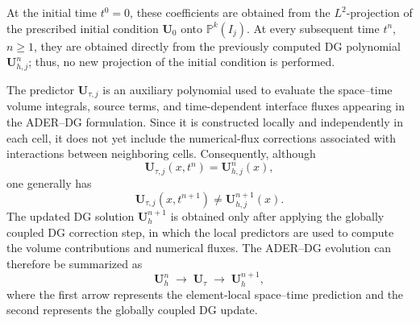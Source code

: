 \documentclass[11pt]{article}
\begin{document}
At the initial time $t^0=0$, these coefficients are obtained from the
$L^2$-projection of the prescribed initial condition $\mathbf{U}_0$ onto
$\mathbb{P}^k(I_j)$. At every subsequent time $t^n$, $n\geq 1$, they are
obtained directly from the previously computed DG polynomial
$\mathbf{U}_{h,j}^n$; thus, no new projection of the initial condition is
performed.

The predictor $\mathbf{U}_{\tau,j}$ is an auxiliary polynomial used to
evaluate the space--time volume integrals, source terms, and time-dependent
interface fluxes appearing in the ADER--DG formulation. Since it is
constructed locally and independently in each cell, it does not yet
include the numerical-flux corrections associated with interactions
between neighboring cells. Consequently, although
\[
    \mathbf{U}_{\tau,j}(x,t^n)
    =
    \mathbf{U}_{h,j}^n(x),
\]
one generally has
\[
    \mathbf{U}_{\tau,j}(x,t^{n+1})
    \neq
    \mathbf{U}_{h,j}^{n+1}(x).
\]
The updated DG solution $\mathbf{U}_h^{n+1}$ is obtained only after applying
the globally coupled DG correction step, in which the local predictors are
used to compute the volume contributions and numerical fluxes. The
ADER--DG evolution can therefore be summarized as
\[
    \mathbf{U}_h^n
    \;\longrightarrow\;
    \mathbf{U}_{\tau}
    \;\longrightarrow\;
    \mathbf{U}_h^{n+1},
\]
where the first arrow represents the element-local space--time prediction
and the second represents the globally coupled DG update.
\end{document}
